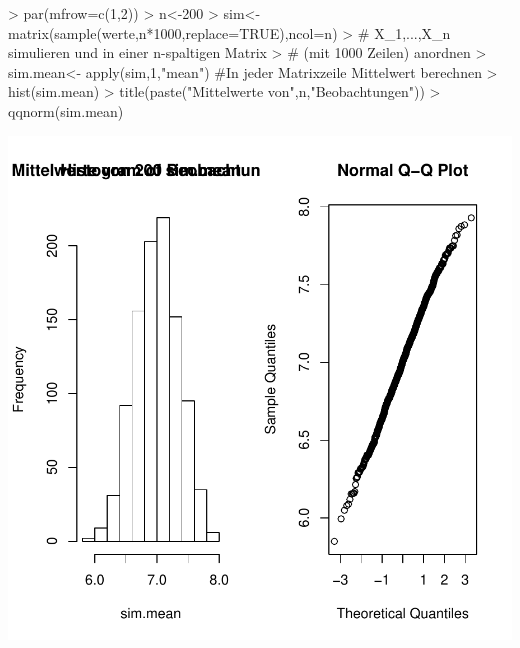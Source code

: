 \begin{Schunk}
\begin{Sinput}
> par(mfrow=c(1,2))
> n<-200
> sim<-matrix(sample(werte,n*1000,replace=TRUE),ncol=n)
> # X_1,...,X_n simulieren und in einer n-spaltigen Matrix
> # (mit 1000 Zeilen) anordnen
> sim.mean<- apply(sim,1,"mean") #In jeder Matrixzeile Mittelwert berechnen
> hist(sim.mean)
> title(paste("Mittelwerte von",n,"Beobachtungen"))
> qqnorm(sim.mean)
\end{Sinput}
\end{Schunk}
\includegraphics{sw08_4-004}

